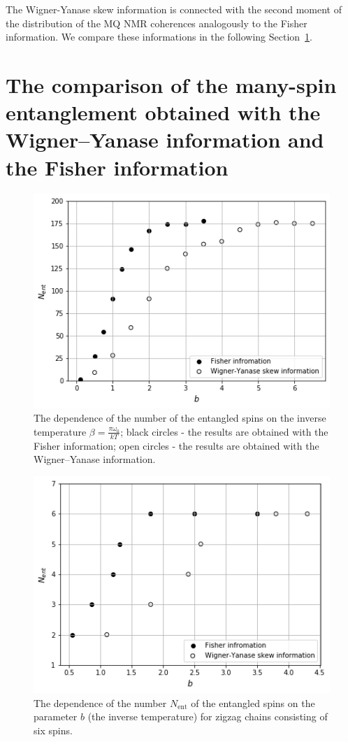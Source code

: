 \documentclass[preprint,12pt]{elsarticle}
\begin{document}
The Wigner-Yanase skew information is connected with the second moment of the distribution of the MQ NMR coherences analogously to the Fisher information.
We compare these informations in the following Section~\ref{sec:4}.


\section{The comparison of the many-spin entanglement obtained with the Wigner--Yanase information and the Fisher information}
\label{sec:4}

\begin{figure}
	\includegraphics[width=0.95\linewidth]{nanopora_entangled_spins_by_temp}
	\caption{
		The dependence of the number of the entangled spins on the inverse temperature $\beta = \frac{\pi \omega_0}{kT}$;
		black circles - the results are obtained with the Fisher information;
		open circles - the results are obtained with the Wigner--Yanase information.
	}
	\label{fig:2}
\end{figure}

\begin{figure}
	\includegraphics[width=0.95\linewidth]{zigzag_entangled_spins_by_temp}
	\caption{
		The dependence of the number $N_\mathrm{ent}$ of the entangled spins on the parameter $b$ (the inverse temperature) for zigzag chains consisting of six spins.
	}
	\label{fig:3}
\end{figure}
\end{document}
